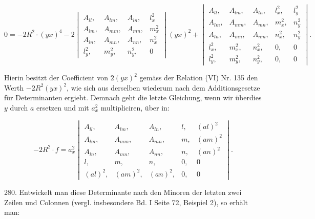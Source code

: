 \[
0 = -2R^2\cdot(yx)^4 - 2
\begin{vmatrix}
A_{ll}, & A_{lm}, & A_{ln}, & l_x^2 \\
A_{lm}, & A_{mm}, & A_{mn}, & m_x^2 \\
A_{ln}, & A_{mn}, & A_{nn}, & n_x^2 \\
l_y^2, & m_y^2, & n_y^2, & 0
\end{vmatrix}(yx)^2 +
\begin{vmatrix}
A_{ll}, & A_{lm}, & A_{ln}, & l_x^2, & l_y^2 \\
A_{lm}, & A_{mm}, & A_{mn}, & m_x^2, & n_y^2 \\
A_{ln}, & A_{mn}, & A_{nm}, & n_x^2, & n_y^2 \\
l_x^2, & m_x^2, & n_x^2, & 0, & 0 \\
l_y^2, & m_y^2, & n_y^2, & 0, & 0
\end{vmatrix}.
\]

Hierin besitzt der Coefficient von $2(yx)^2$ gemäss der Relation (VI) Nr. 135 den Werth $-2R^2(yx)^2$, wie sich aus derselben wiederum nach dem Additionsgesetze für Determinanten ergiebt. Demnach geht die letzte Gleichung, wenn wir überdies $y$ durch $a$ ersetzen und mit $a_x^2$ multipliciren, über in:

\[
-2R^2\cdot f = a_x^2
\begin{vmatrix}
A_{ll}, & A_{lm}, & A_{ln}, & l, & (al)^2 \\
A_{lm}, & A_{mm}, & A_{mn}, & m, & (am)^2 \\
A_{ln}, & A_{mn}, & A_{nn}, & n, & (an)^2 \\
l, & m, & n, & 0, & 0 \\
(al)^2, & (am)^2, & (an)^2, & 0, & 0
\end{vmatrix}.
\]

280. Entwickelt man diese Determinante nach den Minoren der letzten zwei Zeilen und Colonnen (vergl. insbesondere Bd. I Seite 72, Beispiel 2), so erhält man:



